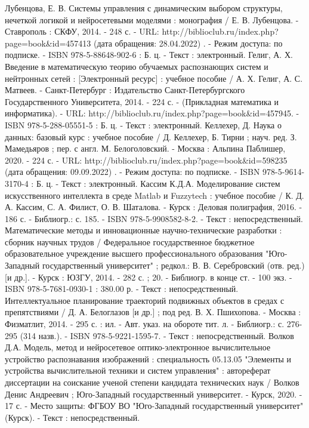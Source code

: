 \begin{thebibliography}{50}
     Лубенцова, Е. В.    Системы управления с динамическим выбором структуры, нечеткой логикой и нейросетевыми моделями : монография / Е. В. Лубенцова. - Ставрополь : СКФУ, 2014. - 248 с. - URL: http://biblioclub.ru/index.php?page=book\&id=457413 (дата обращения: 28.04.2022) . - Режим доступа: по подписке. - ISBN 978-5-88648-902-6 : Б. ц. - Текст : электронный.
    Гелиг, А. Х.    Введение в математическую теорию обучаемых распознающих систем и нейтронных сетей : [Электронный ресурс] : учебное пособие / А. Х. Гелиг, А. С. Матвеев. - Санкт-Петербург : Издательство Санкт-Петербургского Государственного Университета, 2014. - 224 с. - (Прикладная математика и информатика). - URL: http://biblioclub.ru/index.php?page=book\&id=457945. - ISBN 978-5-288-05551-5 : Б. ц. - Текст : электронный.
     Келлехер, Д.    Наука о данных: базовый курс : учебное пособие / Д. Келлехер, Б. Тирни ; науч. ред. З. Мамедьяров ; пер. с англ. М. Белоголовский. - Москва : Альпина Паблишер, 2020. - 224 с. - URL: http://biblioclub.ru/index.php?page=book\&id=598235 (дата обращения: 09.09.2022) . - Режим доступа: по подписке. - ISBN 978-5-9614-3170-4 : Б. ц. - Текст : электронный.
     Кассим К.Д.А.   Моделирование систем искусственного интеллекта в среде Matlab и Fuzzytech : учебное пособие / К. Д. А. Кассим, С. А. Филист, О. В. Шаталова. - Курск : Деловая полиграфия, 2016. - 186 с. - Библиогр.: с. 185. - ISBN 978-5-9908582-8-2. - Текст : непосредственный.
     Математические методы и инновационные научно-технические разработки : сборник научных трудов / Федеральное государственное бюджетное образовательное учреждение высшего профессионального образования "Юго-Западный государственный университет" ; редкол.: В. В. Серебровский (отв. ред.) [и др.]. - Курск : ЮЗГУ, 2014. - 282 с. ; 20. - Библиогр. в конце ст. - 100 экз. - ISBN 978-5-7681-0930-1 : 380.00 р. - Текст : непосредственный.
     Интеллектуальное планирование траекторий подвижных объектов в средах с препятствиями / Д. А. Белоглазов [и др.] ; под ред. В. Х. Пшихопова. - Москва : Физматлит, 2014. - 295 с. : ил. - Авт. указ. на обороте тит. л. - Библиогр.: с. 276-295 (314 назв.). - ISBN 978-5-9221-1595-7. - Текст : непосредственный.
     Волков Д.А.  Модель, метод и нейросетевое оптико-электронное вычислительное устройство распознавания изображений : специальность 05.13.05 "Элементы и устройства вычислительной техники и систем управления" : автореферат диссертации на соискание ученой степени кандидата технических наук / Волков Денис Андреевич ; Юго-Западный государственный университет. - Курск, 2020. - 17 с. - Место защиты: ФГБОУ ВО "Юго-Западный государственный университет" (Курск). - Текст : непосредственный.

\end{thebibliography}
